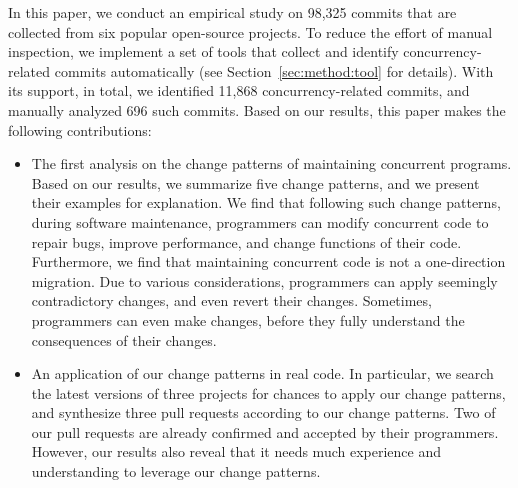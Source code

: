 In this paper, we conduct an empirical study on 98,325 commits that are collected from six popular open-source projects. To reduce the effort of manual inspection, we implement a set of tools that collect and identify concurrency-related commits automatically (see Section~\ref{sec:method:tool} for details). With its support, in total, we identified 11,868 concurrency-related commits, and manually analyzed 696 such commits. Based on our results, this paper makes the following contributions:

\begin{itemize}
	\item The first analysis on the change patterns of maintaining concurrent programs. Based on our results, we summarize five change patterns, and we present their examples for explanation. We find that following such change patterns, during software maintenance, programmers can modify concurrent code to repair bugs, improve performance, and change functions of their code. Furthermore, we find that maintaining concurrent code is not a one-direction migration. Due to various considerations, programmers can apply seemingly contradictory changes, and even revert their changes. Sometimes, programmers can even make changes, before they fully understand the consequences of their changes.
	\item An application of our change patterns in real code. In particular, we search the latest versions of three projects for chances to apply our change patterns, and synthesize three pull requests according to our change patterns. Two of our pull requests are already confirmed and accepted by their programmers. However, our results also reveal that it needs much experience and understanding to leverage our change patterns.
\end{itemize}

